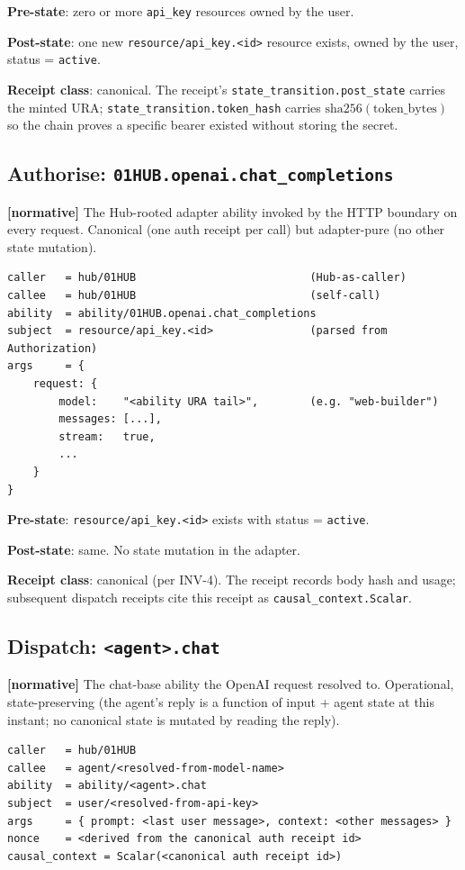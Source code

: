 \documentclass[11pt,a4paper]{article}
\newcommand{\normsv}{\textcolor{normativecolor}{\textbf{[normative]}}\xspace}
\theoremstyle{definition}
\begin{document}
\textbf{Pre-state}: zero or more \texttt{api\_key} resources owned by the user.

\textbf{Post-state}: one new \texttt{resource/api\_key.<id>} resource exists, owned by the user, status = \texttt{active}.

\textbf{Receipt class}: canonical. The receipt's
\texttt{state\_transition.post\_state} carries the minted URA;
\texttt{state\_transition.token\_hash} carries
\(\text{sha256}(\text{token\_bytes})\) so the chain proves a
specific bearer existed without storing the secret.

\subsection{Authorise: \texttt{01HUB.openai.chat\_completions}}

\normsv{} The Hub-rooted adapter ability invoked by the HTTP
boundary on every request. Canonical (one auth receipt per
call) but adapter-pure (no other state mutation).

\begin{lstlisting}
caller   = hub/01HUB                           (Hub-as-caller)
callee   = hub/01HUB                           (self-call)
ability  = ability/01HUB.openai.chat_completions
subject  = resource/api_key.<id>               (parsed from Authorization)
args     = {
    request: {
        model:    "<ability URA tail>",        (e.g. "web-builder")
        messages: [...],
        stream:   true,
        ...
    }
}
\end{lstlisting}

\textbf{Pre-state}: \texttt{resource/api\_key.<id>} exists with status = \texttt{active}.

\textbf{Post-state}: same. No state mutation in the adapter.

\textbf{Receipt class}: canonical (per INV-4). The receipt
records body hash and usage; subsequent dispatch receipts cite
this receipt as \texttt{causal\_context.Scalar}.

\subsection{Dispatch: \texttt{<agent>.chat}}

\normsv{} The chat-base ability the OpenAI request resolved to.
Operational, state-preserving (the agent's reply is a function
of input + agent state at this instant; no canonical state is
mutated by reading the reply).

\begin{lstlisting}
caller   = hub/01HUB
callee   = agent/<resolved-from-model-name>
ability  = ability/<agent>.chat
subject  = user/<resolved-from-api-key>
args     = { prompt: <last user message>, context: <other messages> }
nonce    = <derived from the canonical auth receipt id>
causal_context = Scalar(<canonical auth receipt id>)
\end{lstlisting}
\end{document}
